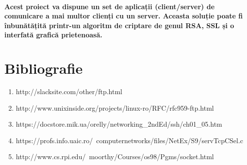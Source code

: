 \documentclass{article}
\begin{document}
	\paragraph{
	Acest proiect va dispune un set de aplicații (client/server) de comunicare a mai multor clienți cu un server. Aceasta soluție poate fi înbunătățită printr-un algoritm de criptare de genul RSA, SSL și o interfată grafică prietenoasă.	
	}
	\newpage
	\section{Bibliografie}
	
	\begin{enumerate}
		\item http://slacksite.com/other/ftp.html
		\item http://www.unixinside.org/projects/linux-ro/RFC/rfc959-ftp.html
		\item https://docstore.mik.ua/orelly/networking\_2ndEd/ssh/ch01\_05.htm
		\item https://profs.info.uaic.ro/~computernetworks/files/NetEx/S9/servTcpCSel.c
		\item http://www.cs.rpi.edu/~moorthy/Courses/os98/Pgms/socket.html
	\end{enumerate}
	
\end{document}
